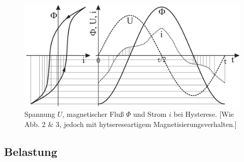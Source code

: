 \documentclass[12pt,a4paper,twoside]{article}
\theoremstyle{definition}
\begin{document}
\begin{figure}[H]
    \centering
    \includegraphics[width=\linewidth/2]{grundlagen/abb4}
    \caption{Spannung $U$, magnetischer Fluß $\Phi$ und Strom $i$ bei Hysterese. [Wie Abb. 2 \& 3, jedoch mit hytsereseartigem Magnetisierungsverhalten.]}
\end{figure}


\subsection{Belastung}
\end{document}
